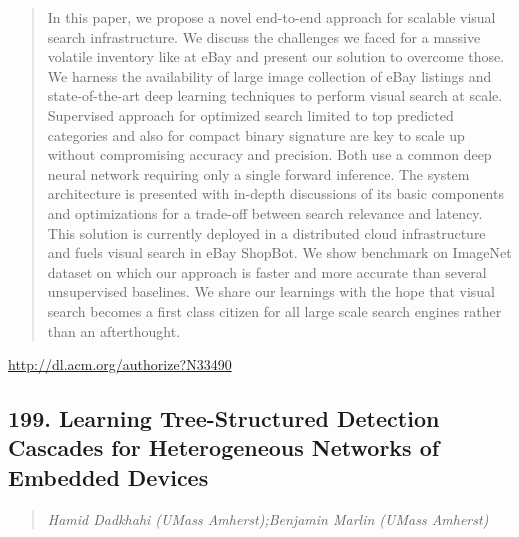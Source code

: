 \documentclass{article}
\begin{document}
\begin{quote}
In this paper, we propose a novel end-to-end approach for scalable visual search infrastructure. We discuss the challenges we faced for a massive volatile inventory like at eBay and present our solution to overcome those. We harness the availability of large image collection of eBay listings and state-of-the-art deep learning techniques to perform visual search at scale. Supervised approach for optimized search limited to top predicted categories and also for compact binary signature are key to scale up without compromising accuracy and precision. Both use a common deep neural network requiring only a single forward inference. The system architecture is presented with in-depth discussions of its basic components and optimizations for a trade-off between search relevance and latency. This solution is currently deployed in a distributed cloud infrastructure and fuels visual search in eBay ShopBot. We show benchmark on ImageNet dataset on which our approach is faster and more accurate than several unsupervised baselines. We share our learnings with the hope that visual search becomes a first class citizen for all large scale search engines rather than an afterthought.
\end{quote}

\href{http://dl.acm.org/authorize?N33490}{http://dl.acm.org/authorize?N33490}

\subsection{199. Learning Tree-Structured Detection Cascades for Heterogeneous Networks of Embedded Devices}

\begin{quote}
\footnotesize{\textit{Hamid Dadkhahi (UMass Amherst);Benjamin Marlin (UMass Amherst)}}

\end{quote}
\end{document}
